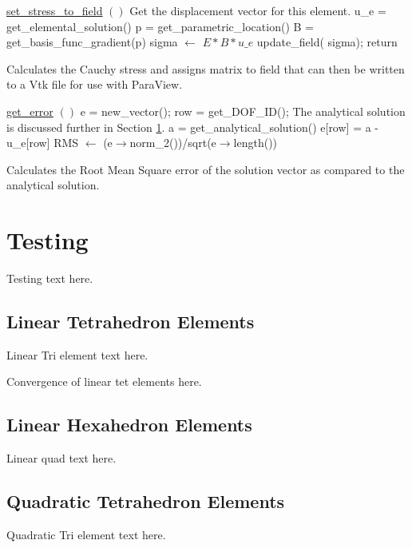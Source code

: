\documentclass[a4paper, 12pt]{article}
\begin{document}
\vspace{\baselineskip}
\begin{algorithm}[H]
  \underline{set\_stress\_to\_field} $()$
  \BlankLine
  {
    \tcc
    {
      Get the displacement vector for this element.
    }
    u\_e = get\_elemental\_solution()\;
    {
      p = get\_parametric\_location()\;
      B = get\_basis\_func\_gradient(p)\;
      sigma $\leftarrow$ $E*B*u\_e$ \;
    }
    update\_field( sigma);
  }
  return\;
  \caption{Calculates the Cauchy stress and assigns matrix to field that
           can then be written to a Vtk file for use with ParaView.}
  \label{al:CauchyStress}
\end{algorithm}

\vspace{\baselineskip}
\begin{algorithm}[H]
  \underline{get\_error} $()$
  \BlankLine
  e = new\_vector();
  {
    {
      row = get\_DOF\_ID();
      \tcc
      {
        The analytical solution is discussed further in
        Section \ref{sec:testing}.
      }
      a = get\_analytical\_solution()\;
      e[row] = a - u\_e[row]\;
    }
  }
  RMS $\leftarrow$ (e$\rightarrow$norm\_2())/sqrt(e$\rightarrow$length())\;
  \caption{Calculates the Root Mean Square error of 
            the solution vector as compared to the analytical solution.}
  \label{al:getError}
\end{algorithm}
\vspace{\baselineskip}

\section{Testing} \label{sec:testing}
Testing text here.

\subsection{Linear Tetrahedron Elements} \label{subsec:linTet}
Linear Tri element text here.

Convergence of linear tet elements here.

\subsection{Linear Hexahedron Elements} \label{subsec:linHex}
Linear quad text here.

\subsection{Quadratic Tetrahedron Elements} \label{subsec:quadTet}
Quadratic Tri element text here.
\end{document}
